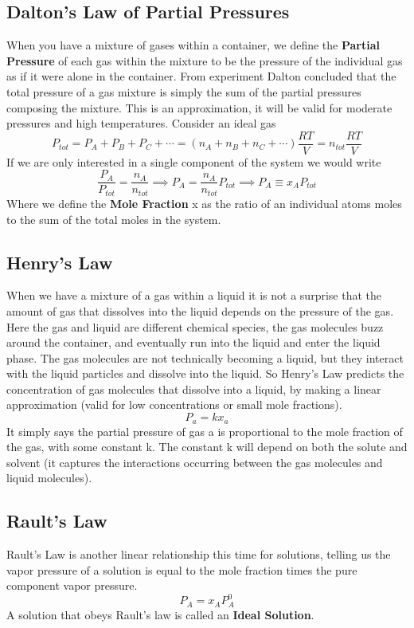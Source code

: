 \documentclass{article}
\begin{document}
\subsection*{Dalton's Law of Partial Pressures}
When you have a mixture of gases within a container, we define the \textbf{Partial Pressure} of each gas within the mixture to be the pressure of the individual gas as if it were alone in the container.
From experiment Dalton concluded that the total pressure of a gas mixture is simply the sum of the partial pressures composing the mixture.
This is an approximation, it will be valid for moderate pressures and high temperatures. 
Consider an ideal gas
\begin{equation}
    P_{tot} = P_A + P_B + P_C + \cdots = (n_A + n_B + n_C + \cdots)\frac{RT}{V } = n_{tot}\frac{RT}{V}
\end{equation}
If we are only interested in a single component of the system we would write
\begin{equation}
    \frac{P_A}{P_{tot}} = \frac{n_A}{n_{tot}} \implies P_A = \frac{n_A}{n_{tot}}P_{tot} \implies P_A \equiv x_A P_{tot}
\end{equation}
Where we define the \textbf{Mole Fraction} x as the ratio of an individual atoms moles to the sum of the total moles in the system. 

\subsection*{Henry's Law}
When we have a mixture of a gas within a liquid it is not a surprise that the amount of gas that dissolves into the liquid depends on the pressure of the gas. 
Here the gas and liquid are different chemical species, the gas molecules buzz around the container, and eventually run into the liquid and enter the liquid phase.
The gas molecules are not technically becoming a liquid, but they interact with the liquid particles and dissolve into the liquid. 
So Henry's Law predicts the concentration of gas molecules that dissolve into a liquid, by making a linear approximation (valid for low concentrations or small mole fractions). 
\begin{equation}
    P_a = k x_a
\end{equation}
It simply says the partial pressure of gas a is proportional to the mole fraction of the gas, with some constant k.
The constant k will depend on both the solute and solvent (it captures the interactions occurring between the gas molecules and liquid molecules). 

\subsection*{Rault's Law}
Rault's Law is another linear relationship this time for solutions, telling us the vapor pressure of a solution is equal to the mole fraction times the pure component vapor pressure. 
\begin{equation}
    P_A = x_AP_A^0
\end{equation}
A solution that obeys Rault's law is called an \textbf{Ideal Solution}. 
\end{document}
